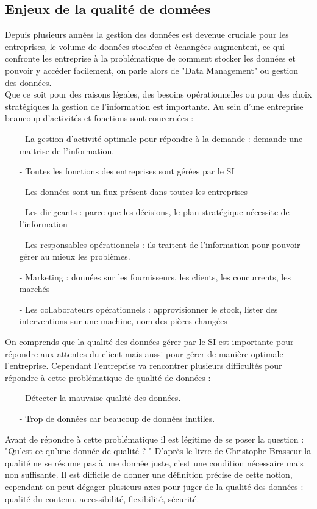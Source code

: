 \subsection {Enjeux de la qualité de données}
Depuis plusieurs années la gestion des données est devenue cruciale pour les entreprises, le volume de données stockées et échangées augmentent, ce qui confronte les entreprise à la problématique de comment stocker les données et pouvoir y accéder facilement, on parle alors de  "Data Management" ou gestion des données.\\ Que ce soit pour des raisons légales, des besoins opérationnelles ou pour des choix stratégiques la gestion de l'information est importante.  Au sein d'une entreprise beaucoup d'activités et fonctions sont concernées :
\begin{itemize}
\item[-] La gestion d’activité optimale pour répondre à la demande : demande une maitrise de l’information.
\item[-] Toutes les fonctions des entreprises sont gérées par le SI
\item[-] Les données sont un flux présent dans toutes les entreprises
\item[-] Les dirigeants : parce que les décisions, le plan stratégique nécessite de l’information
\item[-] Les responsables opérationnels : ils traitent de l’information pour pouvoir gérer au mieux les problèmes. 
\item[-] Marketing : données sur les fournisseurs, les clients, les concurrents, les marchés
\item[-] Les collaborateurs opérationnels : approvisionner le stock, lister des interventions sur une machine, nom des pièces changées
\end{itemize}
On comprends que la qualité des données gérer par le SI est importante pour répondre aux attentes du client mais aussi pour gérer de manière optimale l'entreprise. Cependant l'entreprise va rencontrer plusieurs difficultés pour répondre à cette problématique de  qualité de données : 
\begin{itemize}
\item[-]Détecter la mauvaise qualité des données.
\item[-]Trop de données car beaucoup de données inutiles. 
\end{itemize}
Avant de répondre à cette problématique il est légitime de se poser la question : "Qu'est ce qu'une donnée de qualité ? "
D'après le livre de Christophe Brasseur \cite{Brasseur} la qualité ne se résume pas à une donnée juste, c'est une condition nécessaire mais non suffisante. Il est difficile de donner une définition précise de cette notion, cependant on peut dégager plusieurs axes pour juger de la qualité des données : qualité du contenu, accessibilité, flexibilité, sécurité.
